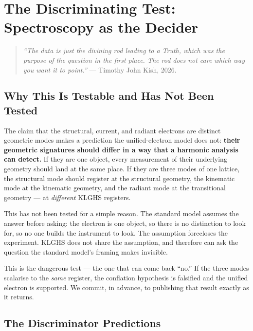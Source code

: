 \documentclass[11pt, letterpaper, openany]{book}
\begin{document}
\clearpage
 
\chapter{The Discriminating Test: Spectroscopy as the Decider}
 
\begin{quote}
\textit{``The data is just the divining rod leading to a Truth, which was
the purpose of the question in the first place. The rod does not care which
way you want it to point.''} --- Timothy John Kish, 2026.
\end{quote}
 
\section{Why This Is Testable and Has Not Been Tested}
 
The claim that the structural, current, and radiant electrons are distinct
geometric modes makes a prediction the unified-electron model does not:
\textbf{their geometric signatures should differ in a way that a harmonic
analysis can detect.} If they are one object, every measurement of their
underlying geometry should land at the same place. If they are three modes
of one lattice, the structural mode should register at the structural
geometry, the kinematic mode at the kinematic geometry, and the radiant
mode at the transitional geometry --- at \emph{different} KLGHS registers.
 
This has not been tested for a simple reason. The standard model assumes
the answer before asking: the electron is one object, so there is no
distinction to look for, so no one builds the instrument to look. The
assumption forecloses the experiment. KLGHS does not share the assumption,
and therefore can ask the question the standard model's framing makes
invisible.
 
This is the dangerous test --- the one that can come back ``no.'' If the
three modes scalarise to the \emph{same} register, the conflation
hypothesis is falsified and the unified electron is supported. We commit,
in advance, to publishing that result exactly as it returns.
 
\section{The Discriminator Predictions}
 
\end{document}
